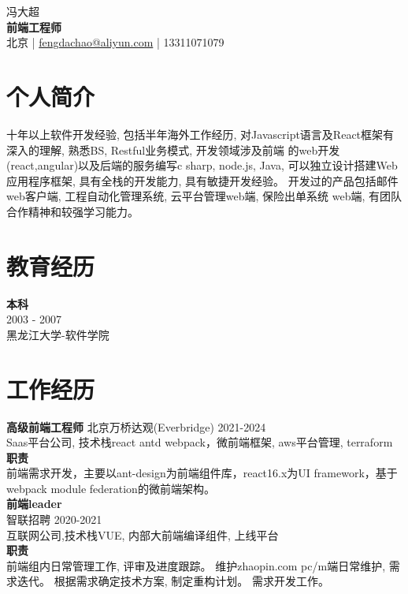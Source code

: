 \documentclass[a4paper,9pt]{extarticle}
\begin{document}
\pagestyle{empty}

\begin{center}
冯大超\\[3pt] %
\textbf{前端工程师}\\[1pt] %
北京 | \href{mailto:fengdachao@aliyun.com}{fengdachao@aliyun.com} | 13311071079 %
\end{center}

\section*{个人简介}
\noindent
\newline
十年以上软件开发经验, 包括半年海外工作经历, 对Javascript语言及React框架有深入的理解, 熟悉BS, Restful业务模式, 开发领域涉及前端 的web开发(react,angular)以及后端的服务编写c sharp, node.js, Java, 可以独立设计搭建Web应用程序框架, 具有全栈的开发能力, 具有敏捷开发经验。 开发过的产品包括邮件web客户端, 工程自动化管理系统, 云平台管理web端, 保险出单系统 web端, 有团队合作精神和较强学习能力。\\


\section*{教育经历}
\noindent
\newline
\textbf{本科} \\
2003 - 2007 \\ 
黑龙江大学-软件学院 \\


\section*{工作经历}
\noindent
\newline
\noindent
\textbf{高级前端工程师}
北京万桥达观(Everbridge) 2021-2024 \\
Saas平台公司, 技术栈react antd webpack，微前端框架, aws平台管理, terraform \\
\textbf{职责} \\
前端需求开发，主要以ant-design为前端组件库，react16.x为UI framework，基于webpack module federation的微前端架构。 \\

\noindent
\textbf{前端leader} \\
智联招聘 2020-2021 \\
互联网公司,技术栈VUE, 内部大前端编译组件, 上线平台 \\ 
\textbf{职责} \\
前端组内日常管理工作, 评审及进度跟踪。 维护zhaopin.com pc/m端日常维护, 需求迭代。 根据需求确定技术方案, 制定重构计划。 需求开发工作。 \\ 
\end{document}
